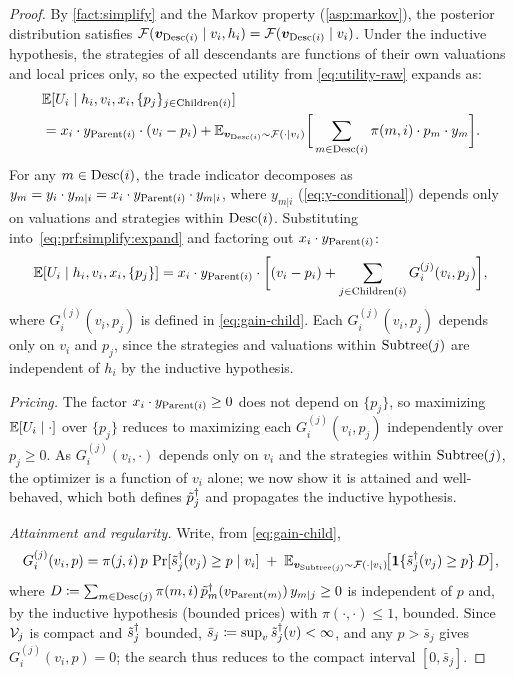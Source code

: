 \begin{proof}
By \cref{fact:simplify} and the Markov property (\cref{asp:markov}), the posterior distribution satisfies $\mathcal{F}({\bm{v}}_{\operatorname{Desc}(i)} \mid v_i, h_i) = \mathcal{F}({\bm{v}}_{\operatorname{Desc}(i)} \mid v_i)$. Under the inductive hypothesis, the strategies of all descendants are functions of their own valuations and local prices only, so the expected utility from \cref{eq:utility-raw} expands as:
\begin{align}
&\mathbb{E}[U_i \mid h_i, v_i, x_i, \{p_j\}_{j \in \operatorname{Children}(i)}] \nonumber\\
&= x_i \cdot y_{\operatorname{Parent}(i)} \cdot (v_i - p_i) + \mathbb{E}_{{\bm{v}}_{\operatorname{Desc}(i)} \sim \mathcal{F}(\cdot|v_i)}\bigg[\sum_{m \in \operatorname{Desc}(i)} \pi(m,i) \cdot p_m \cdot y_m\bigg]. \label{eq:prf:simplify:expand}
\end{align}
For any $m \in \operatorname{Desc}(i)$, the trade indicator decomposes as $y_m = y_i \cdot y_{m|i} = x_i \cdot y_{\operatorname{Parent}(i)} \cdot y_{m|i}$, where $y_{m|i}$ (\cref{eq:y-conditional}) depends only on valuations and strategies within $\operatorname{Desc}(i)$. Substituting into~\eqref{eq:prf:simplify:expand} and factoring out $x_i \cdot y_{\operatorname{Parent}(i)}$:
\begin{equation}
\label{eq:prf:simplify:factor}
\mathbb{E}[U_i \mid h_i, v_i, x_i, \{p_j\}] = x_i \cdot y_{\operatorname{Parent}(i)} \cdot \bigg[(v_i - p_i) + \sum_{j \in \operatorname{Children}(i)} G^{(j)}_i(v_i, p_j)\bigg],
\end{equation}
where $G^{(j)}_i(v_i, p_j)$ is defined in \cref{eq:gain-child}. Each $G^{(j)}_i(v_i, p_j)$ depends only on $v_i$ and $p_j$, since the strategies and valuations within $\operatorname{Subtree}(j)$ are independent of $h_i$ by the inductive hypothesis.

\emph{Pricing.} The factor $x_i \cdot y_{\operatorname{Parent}(i)} \ge 0$ does not depend on $\{p_j\}$, so maximizing $\mathbb{E}[U_i \mid \cdot]$ over $\{p_j\}$ reduces to maximizing each $G^{(j)}_i(v_i, p_j)$ independently over $p_j \ge 0$. As $G^{(j)}_i(v_i,\cdot)$ depends only on $v_i$ and the strategies within $\operatorname{Subtree}(j)$, the optimizer is a function of $v_i$ alone; we now show it is attained and well-behaved, which both defines $\tilde{p}^\dagger_j$ and propagates the inductive hypothesis.

\emph{Attainment and regularity.} Write, from \cref{eq:gain-child},
\[
G^{(j)}_i(v_i, p) = \pi(j,i)\,p\,\Pr[\tilde{s}^\dagger_j(v_j) \ge p \mid v_i] \;+\; \mathbb{E}_{{\bm{v}}_{\operatorname{Subtree}(j)} \sim \mathcal{F}(\cdot \mid v_i)}\!\big[\bm{1}\{\tilde{s}^\dagger_j(v_j) \ge p\}\, D\big],
\]
where $D \coloneqq \sum_{m \in \operatorname{Desc}(j)} \pi(m,i)\, \tilde{p}^\dagger_m(v_{\operatorname{Parent}(m)})\, y_{m\mid j} \ge 0$ is independent of $p$ and, by the inductive hypothesis (bounded prices) with $\pi(\cdot,\cdot) \le 1$, bounded. Since $\mathcal{V}_j$ is compact and $\tilde{s}^\dagger_j$ bounded, $\bar s_j \coloneqq \sup_{v}\tilde{s}^\dagger_j(v) < \infty$, and any $p > \bar s_j$ gives $G^{(j)}_i(v_i,p) = 0$; the search thus reduces to the compact interval $[0, \bar s_j]$.


\end{proof}

